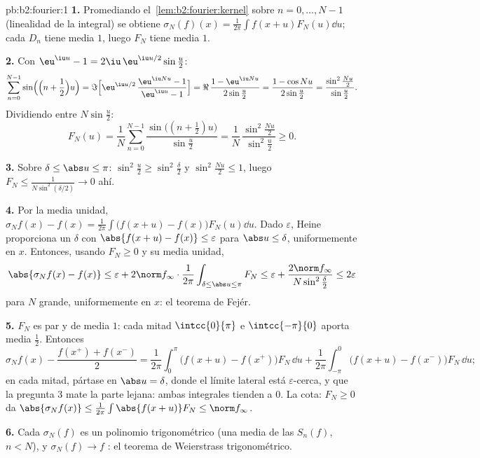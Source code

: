 \begin{solution}{pb:b2:fourier:1}
\textbf{1.} Promediando el~\cref{lem:b2:fourier:kernel} sobre $n = 0,
\dots, N-1$ (linealidad de la integral) se obtiene $\sigma_N(f)(x) =
\frac{1}{2\pi}\int f(x+u)F_N(u)\dd u$; cada $D_n$ tiene media $1$,
luego $F_N$ tiene media $1$.

\textbf{2.} Con $\eu^{\iu u} - 1 = 2\iu\,\eu^{\iu u/2}\sin\frac u2$:
\[
\sum_{n=0}^{N-1}\sin\Bigl(\Bigl(n + \frac12\Bigr)u\Bigr)
= \Im\Bigl[\eu^{\iu u/2}\,\frac{\eu^{\iu Nu} - 1}{\eu^{\iu u}
- 1}\Bigr]
= \Re\,\frac{1 - \eu^{\iu Nu}}{2\sin\frac u2}
= \frac{1 - \cos Nu}{2\sin\frac u2}
= \frac{\sin^2\frac{Nu}2}{\sin\frac u2} .
\]
Dividiendo entre $N\sin\frac u2$:
\[
F_N(u) = \frac1N\sum_{n=0}^{N-1}
\frac{\sin\bigl((n+\frac12)u\bigr)}{\sin\frac u2}
= \frac{1}{N}\,
\frac{\sin^2\frac{Nu}{2}}{\sin^2\frac u2} \geq 0 .
\]

\textbf{3.} Sobre $\delta \leq \abs u \leq \pi$: $\sin^2\frac u2 \geq
\sin^2\frac\delta2$ y $\sin^2\frac{Nu}2 \leq 1$, luego $F_N \leq
\frac{1}{N\sin^2(\delta/2)} \to 0$  ahí.

\textbf{4.} Por la media unidad, $\sigma_Nf(x) - f(x) =
\frac{1}{2\pi}\int\bigl(f(x+u) - f(x)\bigr)F_N(u)\dd u$. Dado
$\varepsilon$, Heine proporciona un $\delta$ con $\abs{f(x+u) -
f(x)} \leq \varepsilon$ para $\abs u \leq \delta$, uniformemente en
$x$. Entonces, usando $F_N \geq 0$ y su media unidad,
\[
\abs{\sigma_Nf(x) - f(x)}
\leq \varepsilon +
2\norm f_\infty\cdot\frac{1}{2\pi}
\int_{\delta\leq\abs u\leq\pi}F_N
\leq \varepsilon + \frac{2\norm
f_\infty}{N\sin^2\frac\delta2}
\leq 2\varepsilon
\]
para $N$ grande, uniformemente en $x$: el teorema de Fejér.

\textbf{5.} $F_N$ es par y de media $1$: cada mitad $\intcc{0}{\pi}$
e $\intcc{-\pi}{0}$ aporta media $\frac12$. Entonces
\[
\sigma_Nf(x) - \frac{f(x^+)+f(x^-)}{2}
= \frac{1}{2\pi}\int_0^\pi\bigl(f(x+u) -
f(x^+)\bigr)F_N\,\dd u
+ \frac{1}{2\pi}\int_{-\pi}^0\bigl(f(x+u) -
f(x^-)\bigr)F_N\,\dd u ;
\]
en cada mitad, pártase en $\abs u = \delta$, donde el límite lateral
está $\varepsilon$-cerca, y que la pregunta 3 mate la parte lejana:
ambas integrales tienden a $0$. La cota: $F_N \geq 0$ da
$\abs{\sigma_Nf(x)} \leq \frac{1}{2\pi}\int\abs{f(x+u)}F_N \leq \norm
f_\infty$.

\textbf{6.} Cada $\sigma_N(f)$ es un polinomio trigonométrico (una
media de las $S_n(f)$, $n < N$), y $\sigma_N(f) \to f$
: el teorema de Weierstrass trigonométrico.


\end{solution}
